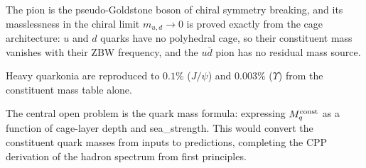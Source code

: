 \documentclass[11pt,a4paper]{article}
\begin{document}
The pion is the pseudo-Goldstone boson of chiral symmetry breaking,
and its masslessness in the chiral limit $m_{u,d} \to 0$ is proved
exactly from the cage architecture: $u$ and $d$ quarks have no
polyhedral cage, so their constituent mass vanishes with their ZBW
frequency, and the $u\bar{d}$ pion has no residual mass source.

Heavy quarkonia are reproduced to $0.1\%$ ($J/\psi$) and $0.003\%$
($\Upsilon$) from the constituent mass table alone.

The central open problem is the quark mass formula: expressing
$M_q^{\rm const}$ as a function of cage-layer depth and
sea\_strength.  This would convert the constituent quark masses
from inputs to predictions, completing the CPP derivation of
the hadron spectrum from first principles.


\end{document}
